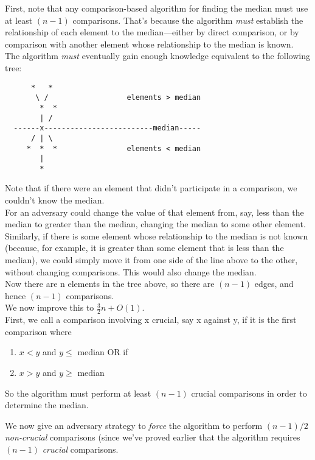 \documentclass[12pt]{article}
\theoremstyle{plain}
\theoremstyle{definition}
\newcommand{\lecture}[1]{\marginpar{{\footnotesize $\leftarrow$ \underline{#1}}}}
\begin{document}
First, note that any comparison-based algorithm for finding the median must use at least $(n - 1)$ comparisons.
That's because the algorithm \emph{must} establish the relationship of each element to the median---either by direct comparison, or by comparison with another element whose relationship to the median is known. \\
The algorithm \emph{must} eventually gain enough knowledge equivalent to the following tree:
\begin{verbatim}
      *   *
       \ /                  elements > median
        *  *
        | /
  ------x-------------------------median-----
      / | \
     *  *  *                elements < median
        |
        *
\end{verbatim}

Note that if there were an element that didn't participate in a comparison, we couldn't know the median. \\
For an adversary could change the value of that element from, say, less than the median to greater than the median, changing the median to some other element. \\
Similarly, if there is some element whose relationship to the median is not known (because, for example, it is greater than some element that is less than the median), we could simply move it from one side of the line above to the other, without changing comparisons.
This would also change the median. \\

Now there are n elements in the tree above, so there are $(n - 1)$ edges, and hence $(n - 1)$ comparisons. \\
We now improve this to $\frac{3}{2}n + O(1)$. \\
First, we call a comparison involving x crucial, say x against y, if it is the first comparison where
\begin{enumerate}
  \item $x < y$ and $y \leq$ median OR if
  \item $x > y$ and $y \geq$ median
\end{enumerate}
So the algorithm must perform at least $(n - 1)$ crucial comparisons in order to determine the median. \\

\lecture{2016/11/01}

We now give an adversary strategy to \emph{force} the algorithm to perform $(n - 1)/2$ \emph{non-crucial} comparisons (since we've proved earlier that the algorithm requires $(n - 1)$ \emph{crucial} comparisons. \\
\end{document}
